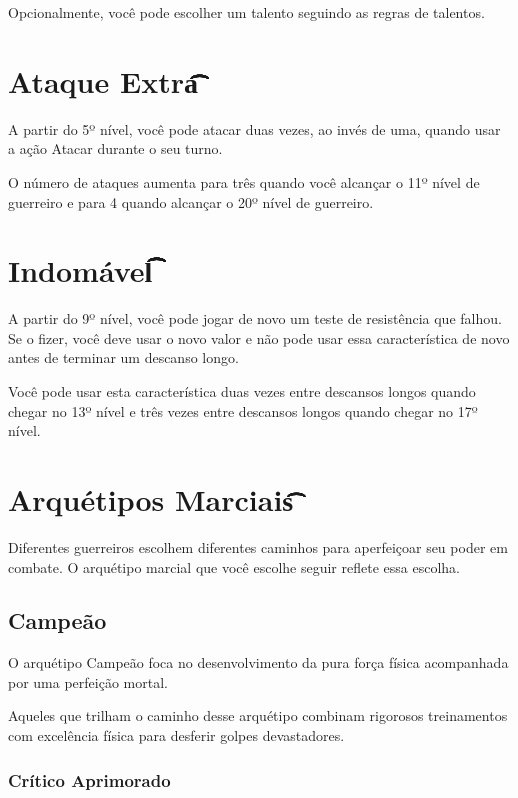 \documentclass{RPG_Adventure}[2021/10/20]
\begin{document}
Opcionalmente, você pode escolher um talento seguindo as regras de talentos.

\section*{Ataque Extra\t\t\t\t\t\t\t\t\t\t}%
\label{sec:ataque_extra}

A partir do 5º nível, você pode atacar duas vezes, ao invés de uma, quando usar
a ação Atacar durante o seu turno.

O número de ataques aumenta para três quando você alcançar o 11º nível de
guerreiro e para 4 quando alcançar o 20º nível de guerreiro.

\section*{Indomável\t\t\t\t\t\t\t\t\t\t\t\t}%
\label{sec:indomavel}

A partir do 9º nível, você pode jogar de novo um teste de resistência que
falhou. Se o fizer, você deve usar o novo valor e não pode usar essa
característica de novo antes de terminar um descanso longo.

Você pode usar esta característica duas vezes entre descansos longos quando
chegar no 13º nível e três vezes entre descansos longos quando chegar no 17º
nível.

\section*{Arquétipos Marciais\t\t\t\t\t\t}%
\label{sec:arquetipos_marciaistttttt}

Diferentes guerreiros escolhem diferentes caminhos para aperfeiçoar seu poder em
combate. O arquétipo marcial que você escolhe seguir reflete essa escolha.

\subsection*{Campeão}%
\label{sub:campeao}

O arquétipo Campeão foca no desenvolvimento da pura força física acompanhada por
uma perfeição mortal.

Aqueles que trilham o caminho desse arquétipo combinam rigorosos treinamentos
com excelência física para desferir golpes devastadores.

\subsubsection{Crítico Aprimorado}%
\label{ssub:critico_aprimorado}
\end{document}

